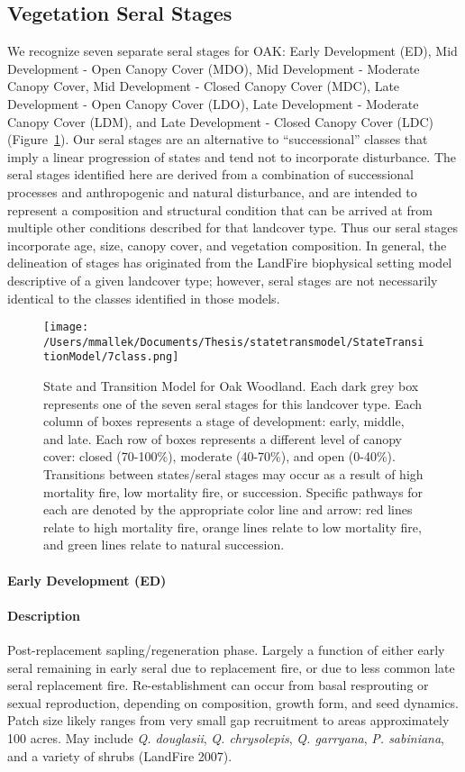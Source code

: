 \subsection*{Vegetation Seral Stages}
We recognize seven separate seral stages for OAK: Early Development (ED), Mid Development - Open Canopy Cover (MDO), Mid Development - Moderate Canopy Cover, Mid Development - Closed Canopy Cover (MDC), Late Development - Open Canopy Cover (LDO), Late Development - Moderate Canopy Cover (LDM), and Late Development - Closed Canopy Cover (LDC) (Figure~\ref{oak_transmodel}). Our seral stages are an alternative to ``successional'' classes that imply a linear progression of states and tend not to incorporate disturbance. The seral stages identified here are derived from a combination of successional processes and anthropogenic and natural disturbance, and are intended to represent a composition and structural condition that can be arrived at from multiple other conditions described for that landcover type. Thus our seral stages incorporate age, size, canopy cover, and vegetation composition. In general, the delineation of stages has originated from the LandFire biophysical setting model descriptive of a given landcover type; however, seral stages are not necessarily identical to the classes identified in those models.


\begin{figure}[htbp]
\centering
\texttt{[image: /Users/mmallek/Documents/Thesis/statetransmodel/StateTransitionModel/7class.png]}
\caption{State and Transition Model for Oak Woodland. Each dark grey box represents one of the seven seral stages for this landcover type. Each column of boxes represents a stage of development: early, middle, and late. Each row of boxes represents a different level of canopy cover: closed (70-100\%), moderate (40-70\%), and open (0-40\%). Transitions between states/seral stages may occur as a result of high mortality fire, low mortality fire, or succession. Specific pathways for each are denoted by the appropriate color line and arrow: red lines relate to high mortality fire, orange lines relate to low mortality fire, and green lines relate to natural succession.} 
\label{oak_transmodel}
\end{figure}

\paragraph*{Early Development (ED)}

\paragraph*{Description} Post-replacement sapling/regeneration phase. Largely a function of either early seral remaining in early seral due to replacement fire, or due to less common late seral replacement fire. Re-establishment can occur from basal resprouting or sexual reproduction, depending on composition, growth form, and seed dynamics. Patch size likely ranges from very small gap recruitment to areas approximately 100 acres. May include \emph{Q. douglasii}, \emph{Q. chrysolepis}, \emph{Q. garryana}, \emph{P. sabiniana}, and a variety of shrubs (LandFire 2007).


